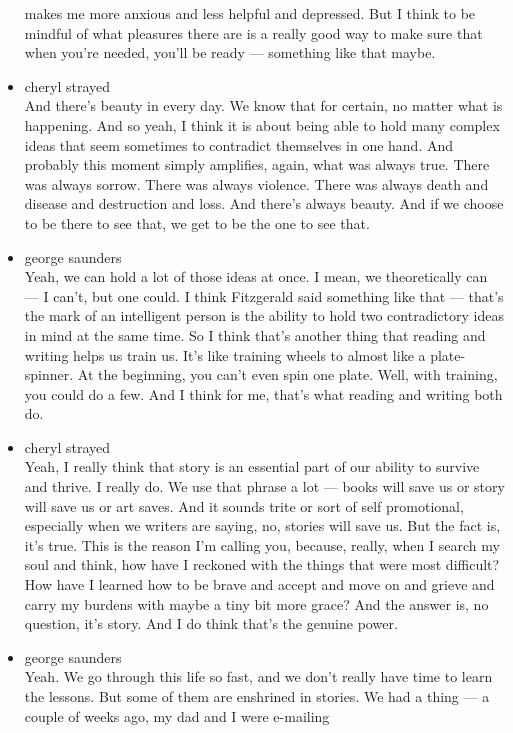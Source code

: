 \begin{itemize}
  makes me more anxious and less helpful and depressed. But I think to
  be mindful of what pleasures there are is a really good way to make
  sure that when you're needed, you'll be ready --- something like that
  maybe.
\item
  cheryl strayed\\
  And there's beauty in every day. We know that for certain, no matter
  what is happening. And so yeah, I think it is about being able to hold
  many complex ideas that seem sometimes to contradict themselves in one
  hand. And probably this moment simply amplifies, again, what was
  always true. There was always sorrow. There was always violence. There
  was always death and disease and destruction and loss. And there's
  always beauty. And if we choose to be there to see that, we get to be
  the one to see that.
\item
  george saunders\\
  Yeah, we can hold a lot of those ideas at once. I mean, we
  theoretically can --- I can't, but one could. I think Fitzgerald said
  something like that --- that's the mark of an intelligent person is
  the ability to hold two contradictory ideas in mind at the same time.
  So I think that's another thing that reading and writing helps us
  train us. It's like training wheels to almost like a plate-spinner. At
  the beginning, you can't even spin one plate. Well, with training, you
  could do a few. And I think for me, that's what reading and writing
  both do.
\item
  cheryl strayed\\
  Yeah, I really think that story is an essential part of our ability to
  survive and thrive. I really do. We use that phrase a lot --- books
  will save us or story will save us or art saves. And it sounds trite
  or sort of self promotional, especially when we writers are saying,
  no, stories will save us. But the fact is, it's true. This is the
  reason I'm calling you, because, really, when I search my soul and
  think, how have I reckoned with the things that were most difficult?
  How have I learned how to be brave and accept and move on and grieve
  and carry my burdens with maybe a tiny bit more grace? And the answer
  is, no question, it's story. And I do think that's the genuine power.
\item
  george saunders\\
  Yeah. We go through this life so fast, and we don't really have time
  to learn the lessons. But some of them are enshrined in stories. We
  had a thing --- a couple of weeks ago, my dad and I were e-mailing

\end{itemize}
